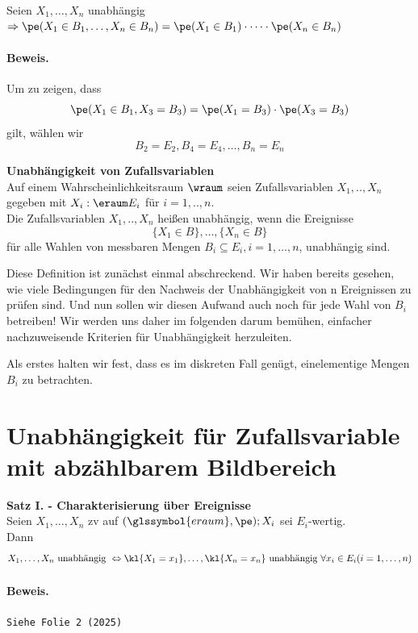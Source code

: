 \begin{satz}  
    Seien $X_1, \dots, X_n$ unabhängig $\Rightarrow \pe(X_1 \in B_1 , \dots , X_n \in B_n) =  \pe(X_1 \in B_1) \cdot \dots \cdot \pe(X_n \in B_n)$

    \paragraph{Beweis.} Um zu zeigen, dass \[\pe(X_1 \in B_1, X_3 = B_3) = \pe(X_1 = B_3) \cdot \pe(X_3 = B_3)\]
    gilt, wählen wir
    \[B_2 = E_2, B_4 = E_4 , \dots, B_n = E_n\]

\end{satz}
\begin{defi}
    \textbf{Unabhängigkeit von Zufallsvariablen}   \\
    Auf einem Wahrscheinlichkeitsraum $\wraum$ seien Zufallsvariablen $X_1, .., X_n$ gegeben mit $X_i : \eraum E_i$ für
    $i = 1, .., n$. \\
    Die Zufallsvariablen $X_1, .., X_n$ heißen unabhängig, wenn die Ereignisse
    \[
        \{X_1 \in B\}, \dots , \{X_n \in B\}
    \]
    für alle Wahlen von messbaren Mengen $B_i \subseteq E_i, i = 1, \dots, n$, unabhängig sind.
\end{defi}
Diese Definition ist zunächst einmal abschreckend.
Wir haben bereits gesehen, wie viele Bedingungen für den Nachweis der Unabhängigkeit von n Ereignissen zu prüfen sind.
Und nun sollen wir diesen Aufwand auch noch für jede Wahl von $B_i$ betreiben!
Wir werden uns daher im folgenden darum bemühen, einfacher nachzuweisende Kriterien für Unabhängigkeit herzuleiten.

Als erstes halten wir fest, dass es im diskreten Fall genügt, einelementige Mengen $B_i$ zu betrachten.

\section{Unabhängigkeit für Zufallsvariable mit abzählbarem Bildbereich}\label{sec:unabhangigkeit-fur-zufallsvariable-mit-abzahlbarem-bildbereich}
\begin{satz}
    \label{satz:satz-i}
    \textbf{Satz I. - Charakterisierung über Ereignisse}   \\
    Seien $X_1, \dots, X_n$ \gls{zv} auf $(\glssymbol{eraum} , \pe); X_i$ sei $E_i$-wertig. \\
    Dann
    \[
        X_1, \dots, X_n \text{ unabhängig } \Leftrightarrow \kl{X_1 = x_1}, \dots, \kl{X_n = x_n}  \text{ unabhängig } \forall x_i \in E_i (i=1, \dots, n)
    \]
    \paragraph{Beweis.} \texttt{Siehe Folie 2 (2025)}
\end{satz}


